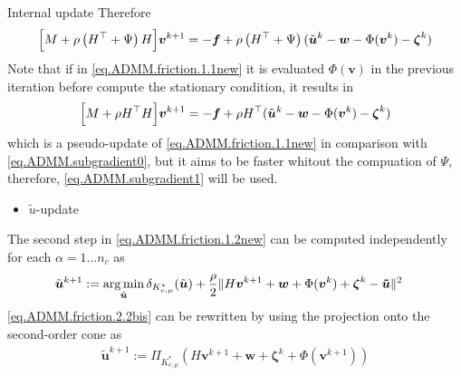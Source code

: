 \documentclass[8pt,red]{beamer}
\theoremstyle{plain}
\theoremstyle{definition}
\theoremstyle{remark}
\newcommand{\argmin}{\operatornamewithlimits{\mathrm{arg\,min}}}
\newcommand{\bi}[1]{\ensuremath{\boldsymbol{#1}}}
\begin{document}
\begin{frame}{Internal update}
Therefore
\begin{align}
  \Bigl[ M + 
  \rho \left( H^{\top} + \Psi \right) H \Bigr] \bi{v}^{k+1} 
  = -\bi{f} 
  + \rho \left( H^{\top} + \Psi \right) (\tilde{\bi{u}}^k - \bi{w} - \Phi(\bi{v}^{k}) - \bi{\zeta}^k)  
  \label{eq.ADMM.subgradient0}
\end{align}
Note that if in \eqref{eq.ADMM.friction.1.1new} it is evaluated $\Phi(\bi{v})$ in the previous iteration before compute the stationary condition, it results in
\begin{align}
  \Bigl[ M + 
  \rho H^{\top} H \Bigr] \bi{v}^{k+1} 
  = -\bi{f} 
  + \rho H^{\top} (\tilde{\bi{u}}^k - \bi{w} - \Phi(\bi{v}^{k}) - \bi{\zeta}^k) 
  \label{eq.ADMM.subgradient1}
\end{align}
which is a pseudo-update of \eqref{eq.ADMM.friction.1.1new} in comparison with \eqref{eq.ADMM.subgradient0}, but it aims to be faster whitout the compuation of $\Psi$, therefore, \eqref{eq.ADMM.subgradient1} will be used.

\begin{itemize}
\item $\tilde{u}$-update
\end{itemize}
The second step in \eqref{eq.ADMM.friction.1.2new} can be computed independently for each $\alpha = 1 ... n_{c}$ as 
\begin{align}
  \tilde{\bi{u}}^{k+1}
  &:= \argmin_{\tilde{\bi{u}}} 
    \delta_{K_{e,\mu}^{*}}(\tilde{\bi{u}}) 
    + \frac{\rho}{2} 
    \| H \bi{v}^{k+1} + \bi{w} + \Phi(\bi{v}^{k}) + \bi{\zeta}^{k} - \bi{\tilde u} \|^{2}
  \label{eq.ADMM.friction.2.2bis}
\end{align}
\eqref{eq.ADMM.friction.2.2bis} can be rewritten by using the projection 
onto the second-order cone as 
\begin{align}
  \tilde{\bi{u}}^{k+1} := \Pi_{K_{e,\mu}^{*}}(H \bi{v}^{k+1} + \bi{w} + \bi{\zeta}^{k} + \Phi(\bi{v}^{k+1}))
\end{align}
\end{frame}
\end{document}
